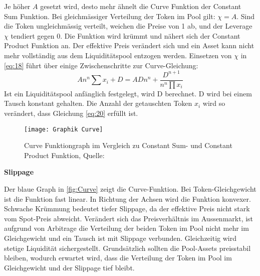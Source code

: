 \documentclass[12pt,a4paper,titlepage,oneside,english]{article}
\begin{document}
Je höher $A$ gesetzt wird, desto mehr ähnelt die Curve Funktion der Constant Sum Funktion.
Bei gleichmässiger Verteilung der Token im Pool gilt: $\chi = A$. %
Sind die Token ungleichmässig verteilt, weichen die Preise von 1 ab, und der Leverage $\chi$ tendiert gegen 0. Die Funktion wird krümmt und nähert sich der Constant Product Funktion an. Der effektive Preis verändert sich und ein Asset kann nicht mehr vollständig aus dem Liquiditätspool entzogen werden. Einsetzen von $\chi$ in \ref{eq:18} führt über einige Zwischenschritte %
zur Curve-Gleichung:
\begin{equation}
An^n\sum x_{i}+D = ADn^n + \dfrac{D^{n+1}}{n^{n} \prod x_{i}} \label{eq:20}
\end{equation}
Ist ein Liquiditätspool anfänglich festgelegt, wird D berechnet. D wird bei einem Tausch konstant gehalten. Die Anzahl der getauschten Token $x_{i}$ wird so verändert, dass Gleichung \ref{eq:20} erfüllt ist. \\

\begin{figure}[h!]
\begin{center}
\texttt{[image: Graphik Curve]}
\caption{Curve Funktiongraph im Vergleich zu Constant Sum- und Constant Product Funktion, Quelle: \citet[S.3]{Egorov2019}}\label{fig:Curve}
\end{center}
\end{figure}
\newpage
\textbf{Slippage}

Der blaue Graph in \autoref{fig:Curve} zeigt die Curve-Funktion. Bei Token-Gleichgewicht %
ist die Funktion fast linear. In Richtung der Achsen wird die Funktion konvexer. Schwache Krümmung bedeutet tiefer Slippage, da der effektive Preis nicht stark vom Spot-Preis abweicht. Verändert sich das Preisverhältnis im Aussenmarkt, ist aufgrund von Arbitrage die Verteilung der beiden Token im Pool nicht mehr im Gleichgewicht und ein Tausch ist mit Slippage verbunden.  Gleichzeitig wird stetige Liquidität sichergestellt. Grundsätzlich sollten die Pool-Assets preisstabil bleiben, wodurch erwartet wird, dass die Verteilung der Token im Pool im Gleichgewicht und der Slippage tief bleibt. \citep[vgl.][S.3f.]{Egorov2019} \\

\end{document}
